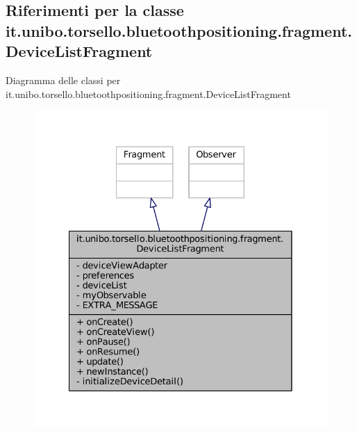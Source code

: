 \hypertarget{classit_1_1unibo_1_1torsello_1_1bluetoothpositioning_1_1fragment_1_1DeviceListFragment}{}\subsection{Riferimenti per la classe it.\+unibo.\+torsello.\+bluetoothpositioning.\+fragment.\+Device\+List\+Fragment}
\label{classit_1_1unibo_1_1torsello_1_1bluetoothpositioning_1_1fragment_1_1DeviceListFragment}


Diagramma delle classi per it.\+unibo.\+torsello.\+bluetoothpositioning.\+fragment.\+Device\+List\+Fragment
\nopagebreak
\begin{figure}[H]
\begin{center}
\leavevmode
\includegraphics[width=328pt]{classit_1_1unibo_1_1torsello_1_1bluetoothpositioning_1_1fragment_1_1DeviceListFragment__inherit__graph}
\end{center}
\end{figure}


